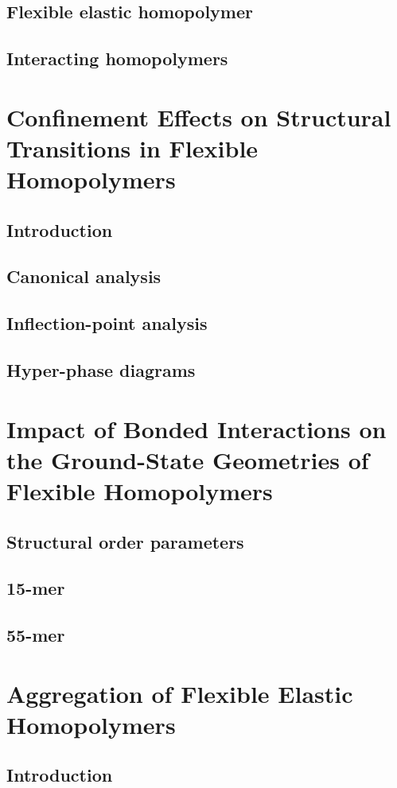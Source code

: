 \documentclass[12pt]{report}
\begin{document}
\section{Flexible elastic homopolymer}
\section{Interacting homopolymers}

\chapter{Confinement Effects on Structural Transitions in Flexible Homopolymers}
\section{Introduction}
\section{Canonical analysis}
\section{Inflection-point analysis}
\section{Hyper-phase diagrams}

\chapter{Impact of Bonded Interactions on the Ground-State Geometries of Flexible Homopolymers}
\section{Structural order parameters}
\section{15-mer}
\section{55-mer}

\chapter{Aggregation of Flexible Elastic Homopolymers}
\section{Introduction}
\end{document}
